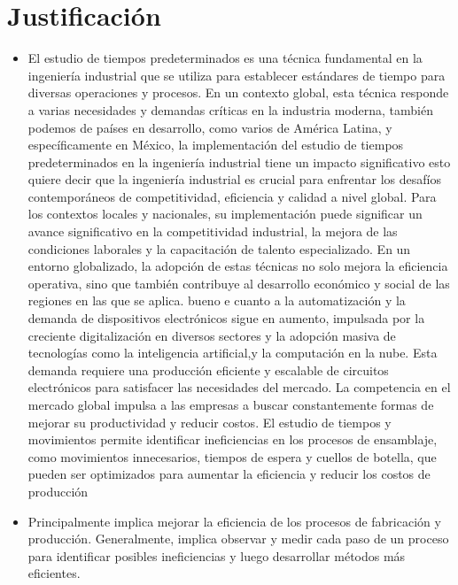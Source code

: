      
    \section{Justificación}
    
    \begin{itemize}
    \item El estudio de tiempos predeterminados es una técnica fundamental en la ingeniería industrial que se utiliza para establecer estándares de tiempo para diversas operaciones y procesos. En un contexto global, esta técnica responde a varias necesidades y demandas críticas en la industria moderna, también podemos de países en desarrollo, como varios de América Latina, y específicamente en México, la implementación del estudio de tiempos predeterminados en la ingeniería industrial tiene un impacto significativo esto quiere decir que la ingeniería industrial es crucial para enfrentar los desafíos contemporáneos de competitividad, eficiencia y calidad a nivel global. Para los contextos locales y nacionales, su implementación puede significar un avance significativo en la competitividad industrial, la mejora de las condiciones laborales y la capacitación de talento especializado. En un entorno globalizado, la adopción de estas técnicas no solo mejora la eficiencia operativa, sino que también contribuye al desarrollo económico y social de las regiones en las que se aplica. bueno e cuanto a la automatización y la demanda de dispositivos electrónicos sigue en aumento, impulsada por la creciente digitalización en diversos sectores y la adopción masiva de tecnologías como la inteligencia artificial,y la computación en la nube. Esta demanda requiere una producción eficiente y escalable de circuitos electrónicos para satisfacer las necesidades del mercado.
    La competencia en el mercado global impulsa a las empresas a buscar constantemente formas de mejorar su productividad y reducir costos. El estudio de tiempos y movimientos permite identificar ineficiencias en los procesos de ensamblaje, como movimientos innecesarios, tiempos de espera y cuellos de botella, que pueden ser optimizados para aumentar la eficiencia y reducir los costos de producción \cite{González}
    \cite{Niebel3}
    \item Principalmente implica mejorar la eficiencia de los procesos de fabricación y producción. Generalmente, implica observar y medir cada paso de un proceso para identificar posibles ineficiencias y luego desarrollar métodos más eficientes.
      
    \end{itemize}
    
